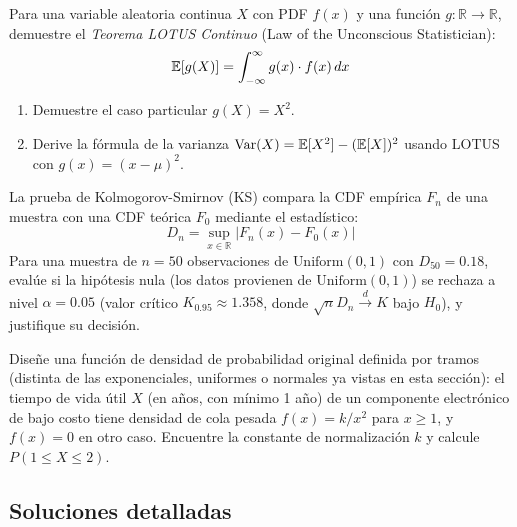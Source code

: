 \begin{problema}
	\label{prob:19f62fd}
	Para una variable aleatoria continua $X$ con PDF $f(x)$ y una función $g: \mathbb{R} \to \mathbb{R}$, demuestre el \emph{Teorema LOTUS Continuo} (Law of the Unconscious Statistician):
	$$\mathbb{E}[g(X)] = \int_{-\infty}^{\infty} g(x) \cdot f(x)\,dx$$
	\begin{enumerate}
		\item Demuestre el caso particular $g(X) = X^{2}$.
		\item Derive la fórmula de la varianza $\operatorname{Var}(X) = \mathbb{E}[X^{2}] - (\mathbb{E}[X])^{2}$ usando LOTUS con $g(x) = (x - \mu)^{2}$.
	\end{enumerate}
\end{problema}

\begin{problema}
	\label{prob:8ec7e10}
	La prueba de Kolmogorov-Smirnov (KS) compara la CDF empírica $F_{n}$ de una muestra con una CDF teórica $F_{0}$ mediante el estadístico:
	$$D_{n} = \sup_{x \in \mathbb{R}} |F_{n}(x) - F_{0}(x)|$$
	Para una muestra de $n = 50$ observaciones de $\text{Uniform}(0, 1)$ con $D_{50} = 0.18$, evalúe si la hipótesis nula (los datos provienen de $\text{Uniform}(0,1)$) se rechaza a nivel $\alpha = 0.05$ (valor crítico $K_{0.95} \approx 1.358$, donde $\sqrt{n} D_n \xrightarrow{d} K$ bajo $H_0$), y justifique su decisión.
\end{problema}

\begin{problema}
	\label{prob:0d490fc}
	Diseñe una función de densidad de probabilidad original definida por tramos (distinta de las exponenciales, uniformes o normales ya vistas en esta sección): el tiempo de vida útil $X$ (en años, con mínimo 1 año) de un componente electrónico de bajo costo tiene densidad de cola pesada $f(x) = k/x^{2}$ para $x \ge 1$, y $f(x) = 0$ en otro caso. Encuentre la constante de normalización $k$ y calcule $P(1 \le X \le 2)$.
\end{problema}

\subsection*{Soluciones detalladas}

